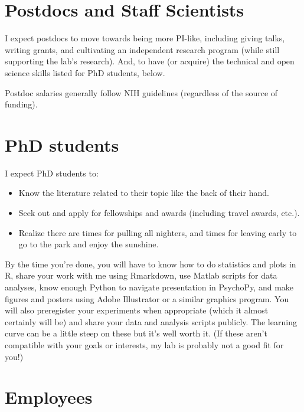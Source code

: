 \documentclass[letterpaper,12pt,oneside]{memoir}
\begin{document}
\section{Postdocs and Staff Scientists}

I expect postdocs to move towards being more PI-like, including  giving talks, writing grants, and cultivating an independent research program (while still supporting the lab's research). And, to have (or acquire) the technical and open science skills listed for PhD students, below.


Postdoc salaries generally follow NIH guidelines (regardless of the source of funding).

\section{PhD students}

I expect PhD students to:

\begin{itemize}
\item Know the literature related to their topic like the back of their hand.
\item Seek out and apply for fellowships and awards (including travel awards, etc.).
\item Realize there are times for pulling all nighters, and times for leaving early to go to the park and enjoy the sunshine.
\end{itemize}

By the time you're done, you will have to know how to do statistics and plots in R, share your work with me using Rmarkdown, use Matlab scripts for data analyses, know enough Python to navigate presentation in PsychoPy, and  make figures and posters using Adobe Illustrator or a similar graphics program. You will also 
preregister your experiments when appropriate (which it almost certainly will be) and share your data and analysis scripts publicly. The learning curve can be a little steep on these but it's well worth it. (If these aren't compatible with your goals or interests, my lab is probably not a good fit for you!)



\section{Employees}
\end{document}
